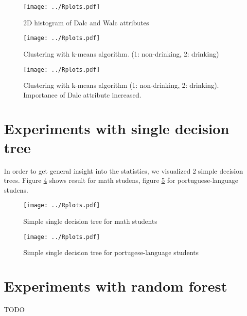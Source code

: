 \documentclass[a4paper]{article}
\begin{document}

\begin{figure}[h]
    \caption[]{2D histogram of Dalc and Walc attributes}
    \centering
    \texttt{[image: ../Rplots.pdf]}
    \label{fig:hist2D}
\end{figure}

\begin{figure}[h]
    \caption[]{Clustering with k-means algorithm. (1: non-drinking, 2: drinking)}
    \centering
    \texttt{[image: ../Rplots.pdf]}
    \label{fig:clust}
\end{figure}

\begin{figure}[h]
    \caption[]{Clustering with k-means algorithm (1: non-drinking, 2: drinking). Importance of Dalc attribute increased.}
    \centering
    \texttt{[image: ../Rplots.pdf]}
    \label{fig:clust2}
\end{figure}

\section{Experiments with single decision tree}

In order to get general insight into the statistics, we visualized 2 simple decision trees.
Figure \ref{fig:single1} shows result for math studens,
figure \ref{fig:single2} for portuguese-language studens.

\begin{figure}[h]
    \caption[]{Simple single decision tree for math students}
    \centering
    \texttt{[image: ../Rplots.pdf]}
    \label{fig:single1}
\end{figure}

\begin{figure}[h]
    \caption[]{Simple single decision tree for portugese-language students}
    \centering
    \texttt{[image: ../Rplots.pdf]}
    \label{fig:single2}
\end{figure}

\section{Experiments with random forest}
TODO
\end{document}
